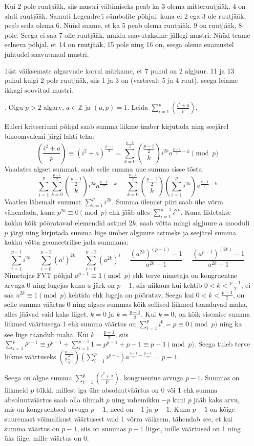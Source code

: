 \documentclass[a4paper, 10pt]{article}
\newcommand{\Z}{\mathbb{Z}}
\newcommand{\leg}[2]{\left(\frac{#1}{#2}\right)}
\begin{document}
Kui 2 pole ruutjääk, siis mustri vältimiseks peab ka 3 olema mitteruutjääk. 4 on alati ruutjääk. Samuti Legendre'i sümbolite põhjal, kuna ei 2 ega 3 ole ruutjääk, peab seda olema 6. Nüüd saame, et ka 5 peab olema ruutjääk. 9 on ruutjääk, 8 pole. Seega ei saa 7 olle ruutjääk, muidu saavutaksime jällegi mustri. Nüüd teame eelneva põhjal, et 14 on ruutjääk, 15 pole ning 16 on, seega oleme enamustel juhtudel saavutanud mustri. 

14st väiksemate algarvude korral märkame, et 7 puhul on 2 algjuur. 11 ja 13 puhul kuigi 2 pole ruutjääk, siis 1 ja 3 on (vastavalt 5 ja 4 ruut), seega leiame ikkagi soovitud mustri.
\bigskip


\pagebreak

. Olgu $p>2$ algarv, $a\in\Z$ ja $(a,p) = 1$. Leida $\sum\limits_{i=1}^{p}\left(\frac{i^2+a}{p}\right).$

\bigskip
Euleri kriteeriumi põhjal saab summa liikme ümber kirjutada ning seejärel binoomvalemi järgi lahti teha: $$\leg{i^2+a}p\equiv(i^2+a)^{\frac{p-1}2}=\sum_{k=0}^{\frac{p-1}2}\binom{\frac{p-1}2}{k}i^{2k}a^{\frac{p-1}2-k}\pmod p$$Vaadates algset summat, saab selle summa uue summa sisse tõsta:$$\sum\limits_{i=1}^{p}\sum_{k=0}^{\frac{p-1}2}\binom{\frac{p-1}2}{k}i^{2k}a^{\frac{p-1}2-k}=\sum_{k=0}^{\frac{p-1}2}\binom{\frac{p-1}2}{k}\left(\sum\limits_{i=1}^{p}i^{2k}\right)a^{\frac{p-1}2-k}$$ 
Vaatlen lähemalt summat $\sum_{i=1}^{p}i^{2k}$. Summa ülemist piiri saab ühe võrra vähendada, kuna $p^{2k}\equiv0\pmod p$ ehk jääb alles $\sum_{i=1}^{p-1}i^{2k}$. Kuna liidetakse kokku kõik pööratavad elemendid astmel $2k$, saab võtta mingi algjuure $a$ mooduli $p$ järgi ning kirjutada summa liige ümber algjuure astmeks ja seejärel summa kokku võtta geomeetrilise jada summana: $$\sum_{i=1}^{p-1}i^{2k}=\sum_{i=0}^{p-2}(a^i)^{2k}=\sum_{i=0}^{p-2}(a^{2k})^{i}=\frac{(a^{2k})^{(p-1)}-1}{a^{2k}-1}=\frac{(a^{p-1})^{(2k)}-1}{a^{2k}-1}$$
Nimetajas FVT põhjal $a^{p-1}\equiv1\pmod p$ ehk terve nimetaja on kongruentne arvuga 0 ning lugejas kuna $a$ järk on $p-1$, siis niikaua kui kehtib $0<k<\frac{p-1}2$, ei saa $a^{2k}\equiv1\pmod p$ kehtida ehk lugeja on pööratav. Seega kui $0<k<\frac{p-1}2$, on selle summa väärtus 0 ning algses summas kõik sellised liikmed taanduvad maha, alles jäävad vaid kaks liiget, $k=0$ ja $k=\frac{p-1}2$. Kui $k=0$, on kõik sisemise summa liikmed väärtusega 1 ehk summa väärtus on $\sum_{i=1}^{p}i^{0}=p\equiv0\pmod p$ ning ka see liige taandub maha. Kui $k=\frac{p-1}2$, siis $\sum_{i=1}^{p}i^{p-1}\equiv p^{p-1}+\sum_{i=1}^{p-1}1=p^{p-1}+p-1\equiv p-1\pmod p$. Seega tuleb terve liikme väärtuseks $\binom{\frac{p-1}2}{\frac{p-1}2}\left(\sum\limits_{i=1}^{p}i^{p-1}\right)a^{\frac{p-1}2-\frac{p-1}2}=p-1$.

Seega on algne summa $\sum\limits_{i=1}^{p}\left(\frac{i^2+a}{p}\right).$ kongruentne arvuga $p-1$. Summas on liikmeid $p$ tükki, millest iga ühe absoluutväärtus on 0 või 1 ehk summa absoluutväärtus saab olla ülimalt $p$ ning vahemikku $-p$ kuni $p$ jääb kaks arvu, mis on kongruentsed arvuga $p-1$, need on $-1$ ja $p-1$. Kuna $p-1$ on kõige suuremast võimalikust väärtusest vaid 1 võrra väiksem, tähendab see, et kui summa väärtus on $p-1$, siis on summas $p-1$ liiget, mille väärtused on 1 ning üks liige, mille väärtus on 0.
\bigskip
\end{document}
